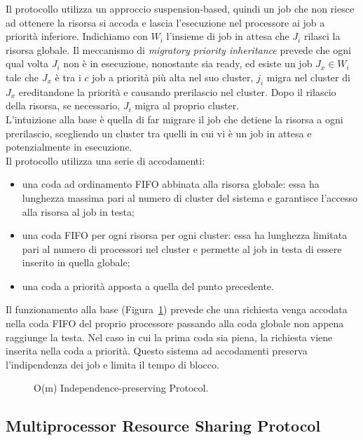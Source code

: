 Il protocollo utilizza un approccio suspension-based, quindi un job che non riesce ad ottenere la risorsa si accoda e lascia l’esecuzione nel processore ai job a priorità inferiore. Indichiamo con $W_i$ l'insieme di job in attesa che $J_i$ rilasci la risorsa globale. Il meccanismo di \textit{migratory priority inheritance} prevede che ogni qual volta $J_i$ non è in esecuzione, nonostante sia ready, ed esiste un job $J_x \in W_i$ tale che $J_x$ è tra i $c$ job a priorità più alta nel suo cluster, $j_i$ migra nel cluster di $J_x$ ereditandone la priorità e causando prerilascio nel cluster. Dopo il rilascio della risorsa, se necessario, $J_i$ migra al proprio cluster.\\
L'intuizione alla base è quella di far migrare il job che detiene la risorsa a ogni prerilascio, scegliendo un cluster tra quelli in cui vi è un job in attesa e potenzialmente in esecuzione.\\

Il protocollo utilizza una serie di accodamenti:

\begin{itemize}
\item una coda ad ordinamento FIFO abbinata alla risorsa globale: essa ha lunghezza massima pari al numero di cluster del sistema e garantisce l'accesso alla risorsa al job in testa;
\item una coda FIFO per ogni risorsa per ogni cluster: essa ha lunghezza limitata pari al numero di processori nel cluster e permette al job in testa di essere inserito in quella globale;
\item una coda a priorità apposta a quella del punto precedente.
\end{itemize}

Il funzionamento alla base (Figura~\ref{fig:locks.omip}) prevede che una richiesta venga accodata nella coda FIFO del proprio processore passando alla coda globale non appena raggiunge la testa. Nel caso in cui la prima coda sia piena, la richiesta viene inserita nella coda a priorità. Questo sistema ad accodamenti preserva l'indipendenza dei job e limita il tempo di blocco.

\begin{figure}
\centering
{}
\caption{O(m) Independence-preserving Protocol.}
\label{fig:locks.omip}
\end{figure}

\subsection{Multiprocessor Resource Sharing Protocol}
\label{sec:lockProtocols.mrsp}

